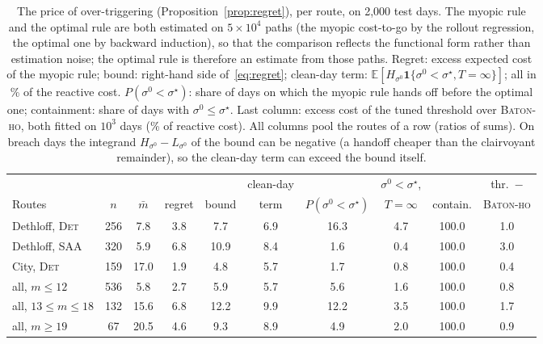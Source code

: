 \begin{table}[t]
\caption{The price of over-triggering (Proposition~\ref{prop:regret}),
per route, on 2{,}000 test days. The myopic rule and the optimal rule
are both estimated on $5\times10^4$ paths (the myopic cost-to-go by the
rollout regression, the optimal one by backward induction), so that the
comparison reflects the functional form rather than estimation noise;
the optimal rule is therefore an estimate from those paths.
Regret: excess expected cost of the myopic rule; bound: right-hand side
of~\eqref{eq:regret}; clean-day term: $\mathbb E[H_{\sigma^0}
\mathbf 1\{\sigma^0 < \sigma^\star, T = \infty\}]$; all in \% of the
reactive cost. $P(\sigma^0 < \sigma^\star)$: share of days on which the
myopic rule hands off before the optimal one; containment: share of days
with $\sigma^0 \le \sigma^\star$. Last column: excess cost of the tuned
threshold over \textsc{Baton-ho}, both fitted on $10^3$ days (\% of
reactive cost). All columns pool the routes of a row (ratios of sums).
On breach days the integrand $H_{\sigma^0} - L_{\sigma^0}$ of the bound
can be negative (a handoff cheaper than the clairvoyant remainder), so
the clean-day term can exceed the bound itself.}
\label{tab:regret}
\centering
\scriptsize
\setlength{\tabcolsep}{2.4pt}
\begin{adjustbox}{max width=\linewidth}
\begin{tabular}{l cc ccc ccc c}
\toprule
& & & & & clean-day & & $\sigma^0 < \sigma^\star$, & & thr.\ $-$ \\
Routes & $n$ & $\bar m$ & regret & bound & term & $P(\sigma^0 < \sigma^\star)$ & $T = \infty$ & contain. & \textsc{Baton-ho} \\
\midrule
Dethloff, \textsc{Det} & 256 & 7.8 & 3.8 & 7.7 & 6.9 & 16.3 & 4.7 & 100.0 & 1.0 \\
Dethloff, \textsc{SAA} & 320 & 5.9 & 6.8 & 10.9 & 8.4 & 1.6 & 0.4 & 100.0 & 3.0 \\
City, \textsc{Det} & 159 & 17.0 & 1.9 & 4.8 & 5.7 & 1.7 & 0.8 & 100.0 & 0.4 \\
\quad all, $m \le 12$ & 536 & 5.8 & 2.7 & 5.9 & 5.7 & 5.6 & 1.6 & 100.0 & 0.8 \\
\quad all, $13 \le m \le 18$ & 132 & 15.6 & 6.8 & 12.2 & 9.9 & 12.2 & 3.5 & 100.0 & 1.7 \\
\quad all, $m \ge 19$ & 67 & 20.5 & 4.6 & 9.3 & 8.9 & 4.9 & 2.0 & 100.0 & 0.9 \\
\bottomrule
\end{tabular}
\end{adjustbox}
\end{table}
